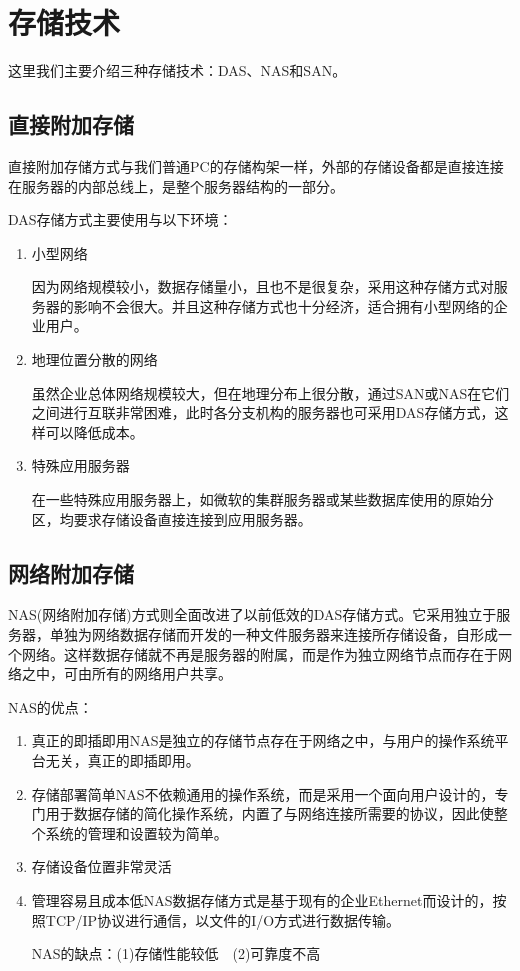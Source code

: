 \section{存储技术}
这里我们主要介绍三种存储技术：DAS、NAS和SAN。
\subsection{直接附加存储}
直接附加存储方式与我们普通PC的存储构架一样，外部的存储设备都是直接连接在服务器的内部总线上，是整个服务器结构的一部分。

DAS存储方式主要使用与以下环境：
\begin{enumerate}
\item 小型网络

因为网络规模较小，数据存储量小，且也不是很复杂，采用这种存储方式对服务器的影响不会很大。并且这种存储方式也十分经济，适合拥有小型网络的企业用户。
\item 地理位置分散的网络

虽然企业总体网络规模较大，但在地理分布上很分散，通过SAN或NAS在它们之间进行互联非常困难，此时各分支机构的服务器也可采用DAS存储方式，这样可以降低成本。
\item 特殊应用服务器

在一些特殊应用服务器上，如微软的集群服务器或某些数据库使用的原始分区，均要求存储设备直接连接到应用服务器。
\end{enumerate}
\subsection{网络附加存储}
NAS(网络附加存储)方式则全面改进了以前低效的DAS存储方式。它采用独立于服务器，单独为网络数据存储而开发的一种文件服务器来连接所存储设备，自形成一个网络。这样数据存储就不再是服务器的附属，而是作为独立网络节点而存在于网络之中，可由所有的网络用户共享。

NAS的优点：
\begin{enumerate}
\item 真正的即插即用\quad NAS是独立的存储节点存在于网络之中，与用户的操作系统平台无关，真正的即插即用。
\item 存储部署简单\quad NAS不依赖通用的操作系统，而是采用一个面向用户设计的，专门用于数据存储的简化操作系统，内置了与网络连接所需要的协议，因此使整个系统的管理和设置较为简单。
\item 存储设备位置非常灵活　
\item 管理容易且成本低\quad NAS数据存储方式是基于现有的企业Ethernet而设计的，按照TCP/IP协议进行通信，以文件的I/O方式进行数据传输。

NAS的缺点：(1)存储性能较低　(2)可靠度不高
\end{enumerate}
